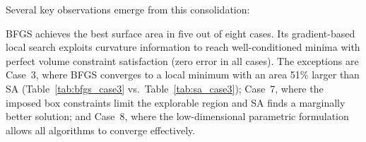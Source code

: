 \begin{table}[H]
\centering
\caption{Consolidated comparison: final surface area (m$^2$) and volume error (m$^3$) for BFGS, SA, and PSO across all eight study cases. Bold entries indicate the best area per case. All algorithms effectively satisfied the volume constraints (except BFGS on Case 3).}
\label{tab:comparison_all}
\end{table}

Several key observations emerge from this consolidation:

BFGS achieves the best surface area in five out of eight cases. Its gradient-based local search exploits curvature information to reach well-conditioned minima with perfect volume constraint satisfaction (zero error in all cases). The exceptions are Case~3, where BFGS converges to a local minimum with an area 51\% larger than SA (Table~\ref{tab:bfgs_case3} vs.\ Table~\ref{tab:sa_case3}); Case~7, where the imposed box constraints limit the explorable region and SA finds a marginally better solution; and Case~8, where the low-dimensional parametric formulation allows all algorithms to converge effectively.

